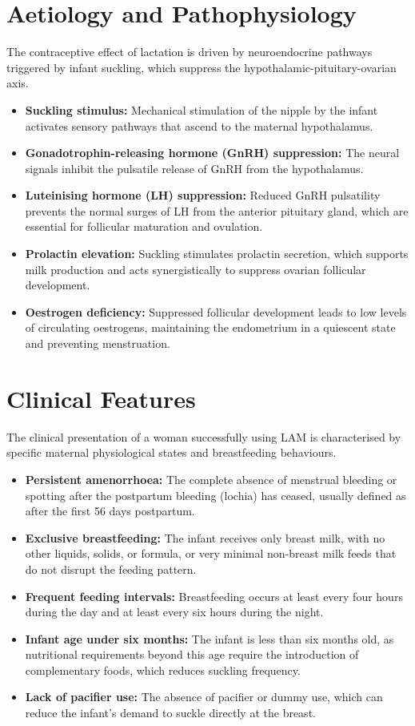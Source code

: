 \section*{Aetiology and Pathophysiology}
The contraceptive effect of lactation is driven by neuroendocrine pathways triggered by infant suckling, which suppress the hypothalamic-pituitary-ovarian axis.
\begin{itemize}
    \item \textbf{Suckling stimulus:} Mechanical stimulation of the nipple by the infant activates sensory pathways that ascend to the maternal hypothalamus.
    \item \textbf{Gonadotrophin-releasing hormone (GnRH) suppression:} The neural signals inhibit the pulsatile release of GnRH from the hypothalamus.
    \item \textbf{Luteinising hormone (LH) suppression:} Reduced GnRH pulsatility prevents the normal surges of LH from the anterior pituitary gland, which are essential for follicular maturation and ovulation.
    \item \textbf{Prolactin elevation:} Suckling stimulates prolactin secretion, which supports milk production and acts synergistically to suppress ovarian follicular development.
    \item \textbf{Oestrogen deficiency:} Suppressed follicular development leads to low levels of circulating oestrogens, maintaining the endometrium in a quiescent state and preventing menstruation.
\end{itemize}

\section*{Clinical Features}
The clinical presentation of a woman successfully using LAM is characterised by specific maternal physiological states and breastfeeding behaviours.
\begin{itemize}
    \item \textbf{Persistent amenorrhoea:} The complete absence of menstrual bleeding or spotting after the postpartum bleeding (lochia) has ceased, usually defined as after the first 56 days postpartum.
    \item \textbf{Exclusive breastfeeding:} The infant receives only breast milk, with no other liquids, solids, or formula, or very minimal non-breast milk feeds that do not disrupt the feeding pattern.
    \item \textbf{Frequent feeding intervals:} Breastfeeding occurs at least every four hours during the day and at least every six hours during the night.
    \item \textbf{Infant age under six months:} The infant is less than six months old, as nutritional requirements beyond this age require the introduction of complementary foods, which reduces suckling frequency.
    \item \textbf{Lack of pacifier use:} The absence of pacifier or dummy use, which can reduce the infant's demand to suckle directly at the breast.
\end{itemize}


